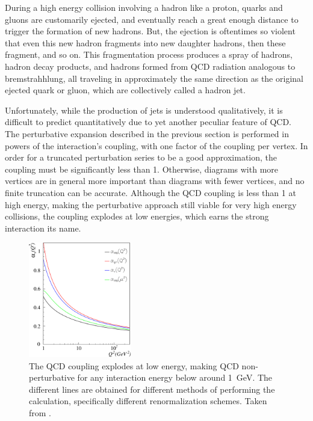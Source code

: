   During a high energy collision involving a hadron like a proton, quarks and gluons are customarily ejected, and eventually reach a great enough distance to trigger the formation of new hadrons.
  But, the ejection is oftentimes so violent that even this new hadron fragments into new daughter hadrons, then these fragment, and so on.
  This fragmentation process produces a spray of hadrons, hadron decay products, and hadrons formed from QCD radiation analogous to bremstrahhlung, all traveling in approximately the same direction as the original ejected quark or gluon, which are collectively called a hadron jet.

  Unfortunately, while the production of jets is understood qualitatively, it is difficult to predict quantitatively due to yet another peculiar feature of QCD.
  The perturbative expansion described in the previous section is performed in powers of the interaction's coupling, with one factor of the coupling per vertex.
  In order for a truncated perturbation series to be a good approximation, the coupling must be significantly less than 1.
  Otherwise, diagrams with more vertices are in general more important than diagrams with fewer vertices, and no finite truncation can be accurate.
  Although the QCD coupling is less than 1 at high energy, making the perturbative approach still viable for very high energy collisions, the coupling explodes at low energies, which earns the strong interaction its name.

  \begin{figure}[h!]
    \centering
    \includegraphics[width=0.4\textwidth]{figures/qcd_coupling.pdf}
    \caption[The QCD coupling as a function of the interaction energy.]{
      The QCD coupling explodes at low energy, making QCD non-perturbative for any interaction energy below around 1~GeV.
      The different lines are obtained for different methods of performing the calculation, specifically different renormalization schemes.
      Taken from \cite{qcd_coupling}.}
    \label{fig:QCDcoupling}
  \end{figure}  

